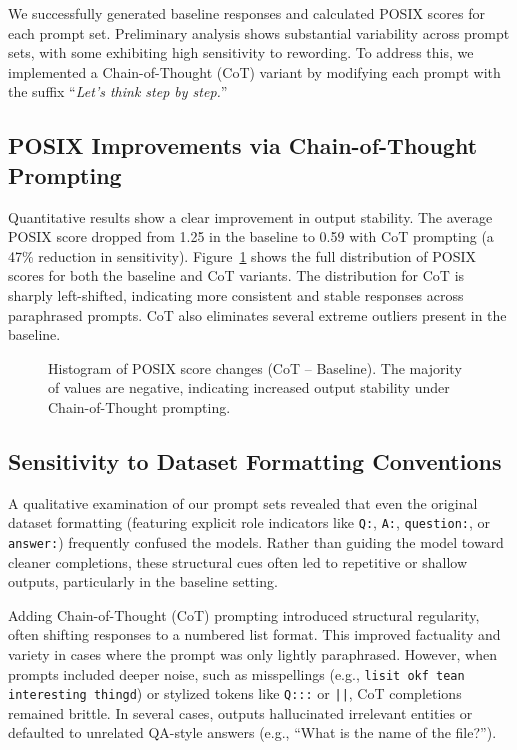 \documentclass[fleqn,moreauthors,10pt]{ds_report}
\begin{document}
We successfully generated baseline responses and calculated POSIX scores for each prompt set. Preliminary analysis shows substantial variability across prompt sets, with some exhibiting high sensitivity to rewording. To address this, we implemented a Chain-of-Thought (CoT) variant by modifying each prompt with the suffix ``\textit{Let's think step by step.}''

\subsection*{POSIX Improvements via Chain-of-Thought Prompting}

Quantitative results show a clear improvement in output stability. The average POSIX score dropped from 1.25 in the baseline to 0.59 with CoT prompting (a 47\% reduction in sensitivity). Figure~\ref{fig:posix_delta_hist} shows the full distribution of POSIX scores for both the baseline and CoT variants. The distribution for CoT is sharply left-shifted, indicating more consistent and stable responses across paraphrased prompts. CoT also eliminates several extreme outliers present in the baseline.

\begin{figure}[h]
    \centering
    
    \caption{Histogram of POSIX score changes (CoT – Baseline). The majority of values are negative, indicating increased output stability under Chain-of-Thought prompting.}
    \label{fig:posix_delta_hist}
\end{figure}

\subsection*{Sensitivity to Dataset Formatting Conventions}

A qualitative examination of our prompt sets revealed that even the original dataset formatting (featuring explicit role indicators like \texttt{Q:}, \texttt{A:}, \texttt{question:}, or \texttt{answer:}) frequently confused the models. Rather than guiding the model toward cleaner completions, these structural cues often led to repetitive or shallow outputs, particularly in the baseline setting. 

Adding Chain-of-Thought (CoT) prompting introduced structural regularity, often shifting responses to a numbered list format. This improved factuality and variety in cases where the prompt was only lightly paraphrased. However, when prompts included deeper noise, such as misspellings (e.g., \texttt{lisit okf tean interesting thingd}) or stylized tokens like \texttt{Q:::} or \texttt{||}, CoT completions remained brittle. In several cases, outputs hallucinated irrelevant entities or defaulted to unrelated QA-style answers (e.g., ``What is the name of the file?'').
\end{document}
